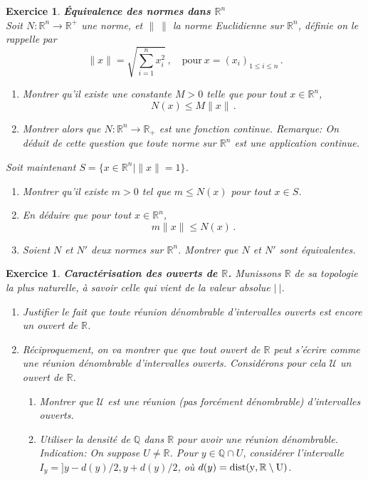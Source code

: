\documentclass[11pt,a4paper]{article}
\newcommand{\Q}{\mathbb{Q}}
\newcommand{\R}{\mathbb{R}}
\newcommand{\abs}[1]{\vert #1 \vert}
\newcommand{\norm}[1]{\| #1 \|}
\newcommand{\set}[1]{\bigl\{#1\mathclose{}\bigr\}}
\newcounter{ex}
\newtheorem{exs}[ex]{Exercice}
\newenvironment{exo}{\begin{exs}\rm}{\end{exs}\vspace{.1cm}}
\begin{document}
\begin{exo}\textbf{Équivalence des normes dans $\R^n$}\\

Soit $N: \R^n\to \R^+$ une norme, et $\norm{\ }$ la norme Euclidienne sur $\R^n$, définie on le rappelle par 
\[
\norm{x} = \sqrt{\sum_{i=1}^n x_i^2}\,,\quad \text{pour}\ x=(x_i)_{1\leq i\leq n}\,.
\]
\begin{enumerate}
\item Montrer qu'il existe une constante $M>0$ telle que pour tout $x\in\R^n$,
\[
N(x)\leq M\norm{x}\,.
\]
\item Montrer alors que $N: \R^n\longrightarrow \R_+$ est une fonction continue. \textit{Remarque: On déduit de cette question que toute norme sur $\R^n$ est une application continue}.
\end{enumerate}
 Soit maintenant $S=\set{x\in\R^n\mid \norm{x}=1}$.
\begin{enumerate}[resume]
    \item Montrer qu'il existe $m>0$ tel que $m\leq N(x)$ pour tout $x\in S$.
    \item En déduire que pour tout $x\in\R^n$,
    \[
    m\norm{x}\leq N(x)\,.
    \]
    \item Soient $N$ et $N'$ deux normes sur $\R^n$. Montrer que $N$ et $N'$ sont \'equivalentes.
\end{enumerate}
\end{exo}

\begin{exo}\textbf{Caractérisation des ouverts de $\R$.}
Munissons $\R$ de sa topologie la plus naturelle, \`a savoir celle qui vient de la valeur absolue $\abs{\ }$. 
\begin{enumerate}
    \item Justifier le fait que toute réunion dénombrable d'intervalles ouverts est encore un ouvert de $\R$.
    \item Réciproquement, on va montrer que que tout ouvert de $\R$ peut s'écrire comme une réunion dénombrable d'intervalles ouverts. Considérons pour cela $\mathcal{U}$ un ouvert de $\R$.
    \begin{enumerate}
        \item Montrer que $\mathcal{U}$ est une réunion (pas forcément dénombrable) d'intervalles ouverts.
        \item Utiliser la densité de $\Q$ dans $\R$ pour avoir une réunion dénombrable. 
 Indication: On suppose $U \neq \R$. Pour $y\in \Q \cap U$, consid\'erer l'intervalle $I_y = ]y-d(y)/2, y+d(y)/2$, o\`u $d(y) = \rm{dist}(y, \R \setminus U)$.
      
    \end{enumerate}
\end{enumerate}
\
\end{exo}
\end{document}
